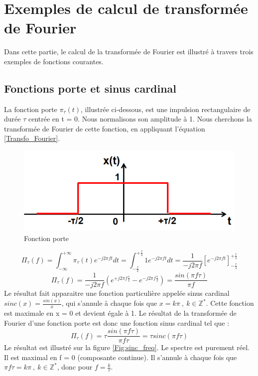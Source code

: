 	\section{Exemples de calcul de transformée de Fourier}
	
	Dans cette partie, le calcul de la transformée de Fourier est illustré à travers trois exemples de fonctions courantes.
	
	\subsection{Fonctions porte et sinus cardinal}
	La fonction porte $\pi_{\tau}(t)$, illustrée ci-dessous, est une impulsion rectangulaire de durée $\tau$ centrée en t = 0. Nous normalisons son amplitude à 1. Nous cherchons la transformée de Fourier de cette fonction, en appliquant l'équation \ref{Transfo_Fourier}.
	
	\begin{figure}[h!]
		\centering
		\includegraphics[scale=0.5]{images/Porte_temporel.png}
		\caption{Fonction porte}	
		\label{Fig:Porte_temporel} 
	\end{figure}

	\begin{equation*}
	\Pi_{\tau}(f)=\int_{-\infty}^{+\infty}\pi_{\tau}(t)e^{-j2\pi ft}dt=\int_{-\frac{\tau}{2}}^{+\frac{\tau}{2}}1e^{-j2\pi ft}dt=\frac{1}{-j2\pi f}[e^{-j2\pi ft}]_{-\frac{\tau}{2}}^{+\frac{\tau}{2}}
	\end{equation*}
	\begin{equation*}
	\Pi_{\tau}(f)=\frac{1}{-j2\pi f}(e^{+j2\pi f\frac{\tau}{2}}-e^{-j2\pi f\frac{\tau}{2}})=\frac{sin(\pi f\tau)}{\pi f}
	\end{equation*}
	Le résultat fait apparaitre une fonction particulière appelée sinus cardinal $sinc(x)=\frac{sin(x)}{x}$, qui s'annule à chaque fois que $x=k\pi~,~k \in \mathbb{Z^{*}}$. Cette fonction est maximale en x = 0 et devient égale à 1. Le résultat de la transformée de Fourier d'une fonction porte est donc une fonction sinus cardinal tel que :
	\begin{equation}\label{TF_porte}
	\Pi_{\tau}(f)=\tau\frac{sin(\pi f\tau)}{\pi f \tau}=\tau sinc(\pi f \tau)
	\end{equation}
	Le résultat est illustré sur la figure \ref{Fig:sinc_freq}. Le spectre est purement réel. Il est maximal en f = 0 (composante continue). Il s'annule à chaque fois que  $\pi f \tau=k\pi~,~k \in \mathbb{Z^{*}}$, donc pour $f=\frac{k}{\tau}$.\\
	
